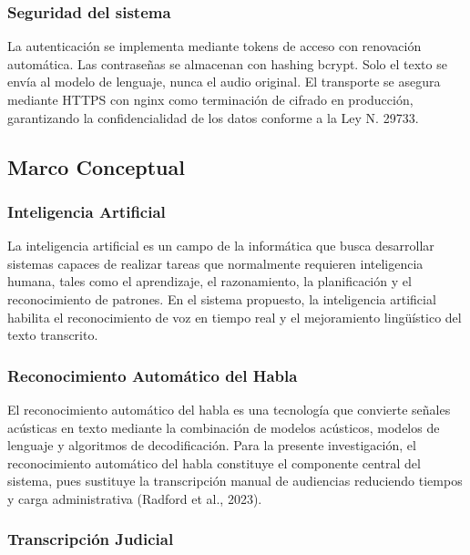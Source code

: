 \documentclass[12pt,a4paper,oneside]{article}
\begin{document}
\subsubsection{Seguridad del sistema}

La autenticaci\'on se implementa mediante tokens de acceso con renovaci\'on autom\'atica. Las contrase\~nas se almacenan con hashing bcrypt. Solo el texto se env\'ia al modelo de lenguaje, nunca el audio original. El transporte se asegura mediante HTTPS con nginx como terminaci\'on de cifrado en producci\'on, garantizando la confidencialidad de los datos conforme a la Ley N.\textordmasculine{} 29733.

\subsection{Marco Conceptual}

\subsubsection{Inteligencia Artificial}

La inteligencia artificial es un campo de la inform\'atica que busca desarrollar sistemas capaces de realizar tareas que normalmente requieren inteligencia humana, tales como el aprendizaje, el razonamiento, la planificaci\'on y el reconocimiento de patrones. En el sistema propuesto, la inteligencia artificial habilita el reconocimiento de voz en tiempo real y el mejoramiento ling\"u\'istico del texto transcrito.

\subsubsection{Reconocimiento Autom\'atico del Habla}

El reconocimiento autom\'atico del habla es una tecnolog\'ia que convierte se\~nales ac\'usticas en texto mediante la combinaci\'on de modelos ac\'usticos, modelos de lenguaje y algoritmos de decodificaci\'on. Para la presente investigaci\'on, el reconocimiento autom\'atico del habla constituye el componente central del sistema, pues sustituye la transcripci\'on manual de audiencias reduciendo tiempos y carga administrativa (Radford et al., 2023).

\subsubsection{Transcripci\'on Judicial}
\end{document}
